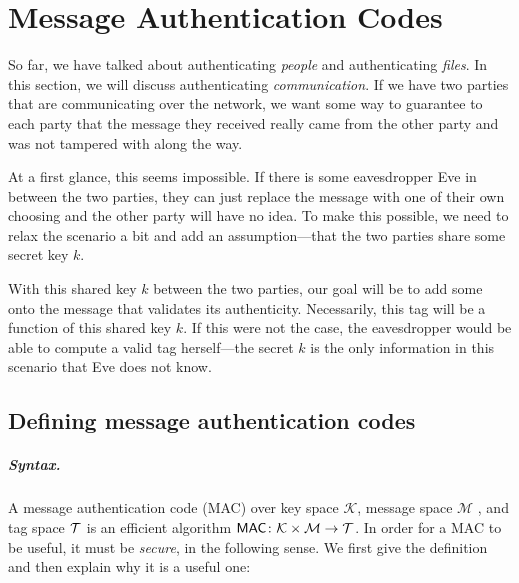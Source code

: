 \chapter{Message Authentication Codes}

\label{lec:mac}

So far, we have talked about authenticating \emph{people} and authenticating \emph{files}. In this section, we will discuss authenticating \emph{communication}. If we have two parties that are communicating over the network, we want some way to guarantee to each party that the message they received really came from the other party and was not tampered with along the way.

At a first glance, this seems impossible. If there is some eavesdropper Eve in between the two parties, they can just replace the message with one of their own choosing and the other party will have no idea. To make this possible, we need to relax the scenario a bit and add an assumption---that the two parties share some secret key $k$. 

With this shared key $k$ between the two parties, our goal will be to add some  onto the message that validates its authenticity. Necessarily, this tag will be a function of this shared key $k$. If this were not the case, the eavesdropper would be able to compute a valid tag herself---the secret $k$ is the only information in this scenario that Eve does not know.



\section{Defining message authentication codes}

\paragraph{Syntax.}
A message authentication code (MAC) 
over key space $\mathcal{K}$, 
message space $\mathcal{M}$ , and tag space $\mathcal{T}$
is an efficient algorithm 
$\mathsf{MAC} \colon \mathcal{K} \times \mathcal{M} \to \mathcal{T}$.
In order for a MAC to be useful, it must be \emph{secure},
in the following sense.
We first give the definition and then explain why it is a useful
one:

